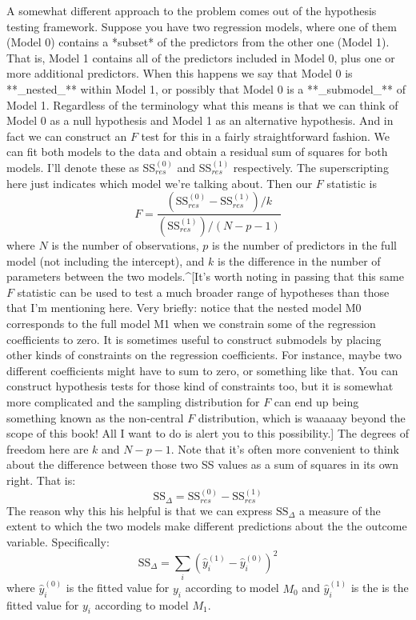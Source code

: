 A somewhat different approach to the problem comes out of the hypothesis testing framework. Suppose you have two regression models, where one of them (Model 0) contains a *subset* of the predictors from the other one (Model 1). That is, Model 1 contains all of the predictors included in Model 0, plus one or more additional predictors. When this happens we say that Model 0 is **_nested_** within Model 1, or possibly that Model 0 is a **_submodel_** of Model 1. Regardless of the terminology what this means is that we can think of Model 0 as a null hypothesis and Model 1 as an alternative hypothesis. And in fact we can construct an $F$ test for this in a fairly straightforward fashion. We can fit both models to the data and obtain a residual sum of squares for both models. I'll denote these as SS$_{res}^{(0)}$ and SS$_{res}^{(1)}$ respectively. The superscripting here just indicates which model we're talking about.  Then our $F$ statistic is
$$
F = \frac{(\mbox{SS}_{res}^{(0)} - \mbox{SS}_{res}^{(1)})/k}{(\mbox{SS}_{res}^{(1)})/(N-p-1)}
$$
where $N$ is the number of observations, $p$ is the number of predictors in the full model (not including the intercept), and $k$ is the difference in the number of parameters between the two models.^[It's worth noting in passing that this same $F$ statistic can be used to test a much broader range of hypotheses than those that I'm mentioning here. Very briefly: notice that the nested model M0 corresponds to the full model M1 when we constrain some of the regression coefficients to zero. It is sometimes useful to construct submodels by placing other kinds of constraints on the regression coefficients. For instance, maybe two different coefficients might have to sum to zero, or something like that. You can construct hypothesis tests for those kind of constraints too, but it is somewhat more complicated and the sampling distribution for $F$ can end up being something known as the non-central $F$ distribution, which is waaaaay beyond the scope of this book! All I want to do is alert you to this possibility.] The degrees of freedom here are $k$ and $N-p-1$. Note that it's often more convenient to think about the difference between those two SS values as a sum of squares in its own right. That is: 
$$
\mbox{SS}_\Delta = \mbox{SS}_{res}^{(0)} - \mbox{SS}_{res}^{(1)}
$$
The reason why this his helpful is that we can express $\mbox{SS}_\Delta$ a measure of the extent to which the two models make different predictions about the the outcome variable. Specifically:
$$
\mbox{SS}_\Delta  = \sum_{i} \left( \hat{y}_i^{(1)} - \hat{y}_i^{(0)} \right)^2
$$
where $\hat{y}_i^{(0)}$ is the fitted value for $y_i$ according to model $M_0$ and  $\hat{y}_i^{(1)}$ is the is the fitted value for $y_i$ according to model $M_1$. 

